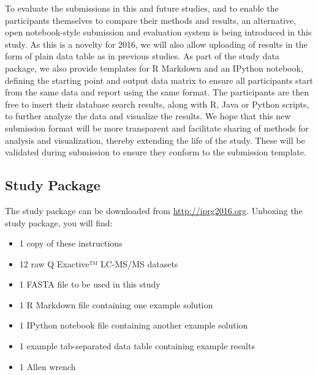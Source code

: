 \documentclass[a4paper,12pt]{article}
\begin{document}
To evaluate the submissions in this and future studies, and to enable the participants themselves to compare their methods and results, an alternative, open notebook-style submission and evaluation system is being introduced in this study. As this is a novelty for 2016, we will also allow uploading of results in the form of plain data table as in previous studies. As part of the study data package, we also provide templates for R Markdown and an IPython notebook, defining the starting point and output data matrix to ensure all participants start from the same data and report using the same format. The participants are then free to insert their database search results, along with R, Java or Python scripts, to further analyze the data and visualize the results. We hope that this new submission format will be more transparent and facilitate sharing of methods for analysis and visualization, thereby extending the life of the study. These will be validated during submission to ensure they conform to the submission template.

\subsection*{Study Package}
The study package can be downloaded from \url{http://iprg2016.org}. Unboxing the study package, you will find:
\begin{itemize}
\item1 copy of these instructions
\item12 raw Q Exactive™ LC-MS/MS datasets
\item1 FASTA file to be used in this study
\item1 R Markdown file containing one example solution
\item1 IPython notebook file containing another example solution
\item1 example tab-separated data table containing example results
\item1 Allen wrench
\end{itemize}
\end{document}
